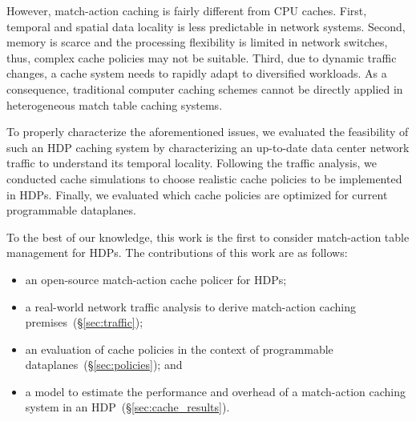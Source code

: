 However, match-action caching is fairly different from CPU caches.
First, temporal and spatial data locality is less predictable in network systems.
Second, memory is scarce and the processing flexibility is limited in network switches, thus, complex cache policies may not be suitable.
Third, due to dynamic traffic changes, a cache system needs to rapidly adapt to diversified workloads.
As a consequence, traditional computer caching schemes cannot be directly applied in heterogeneous match table caching systems. 


To properly characterize the aforementioned issues, we evaluated the feasibility of such an HDP caching system by characterizing an up-to-date data center network traffic to understand its temporal locality.
Following the traffic analysis, we conducted cache simulations to choose realistic cache policies to be implemented in HDPs.
Finally, we evaluated which cache policies are optimized for current programmable dataplanes.%

To the best of our knowledge, this work is the first to consider match-action table management for HDPs.
The contributions of this work are as follows: 

\begin{itemize}[noitemsep,topsep=0pt]
	\item an open-source match-action cache policer for HDPs;
	\item a real-world network traffic analysis to derive match-action caching premises~(\S\ref{sec:traffic});
	\item an evaluation of cache policies in the context of programmable dataplanes~(\S\ref{sec:policies}); and
	\item a model to estimate the performance and overhead of a match-action caching system in an HDP~(\S\ref{sec:cache_results}).
\end{itemize}


